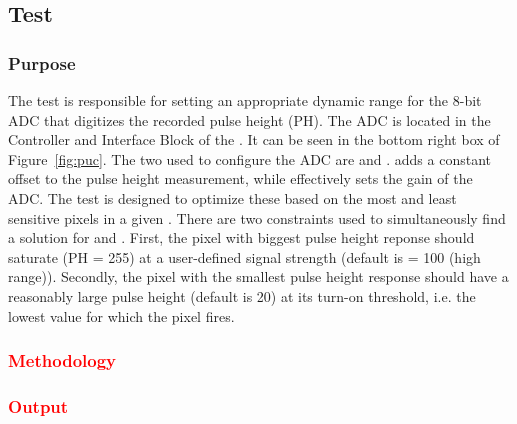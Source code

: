 \subsection{\phopt Test}
\label{ss:phoptimization}

\subsubsection{Purpose}

The \phopt test is responsible for setting an appropriate dynamic range for the 8-bit ADC that digitizes the recorded pulse height (PH).
The ADC is located in the Controller and Interface Block of the \roc.
It can be seen in the bottom right box of Figure~\ref{fig:puc}.
The two \dacs used to configure the ADC are \phoffset and \phscale.
\phoffset adds a constant offset to the pulse height measurement,
while \phscale effectively sets the gain of the ADC.
The \phopt test is designed to optimize these \dacs based on the most and least sensitive pixels in a given \roc.
There are two constraints used to simultaneously find a solution for \phoffset and \phscale.
First, the pixel with biggest pulse height reponse should saturate (PH = 255) at a user-defined signal strength
(default is \vcal = 100 (high range)).
Secondly, the pixel with the smallest pulse height response should have a reasonably large pulse height
(default is 20) at its \vcal turn-on threshold,
i.e. the lowest \vcal value for which the pixel fires.

\subsubsection{\textcolor{red}{Methodology}}
\subsubsection{\textcolor{red}{Output}}

